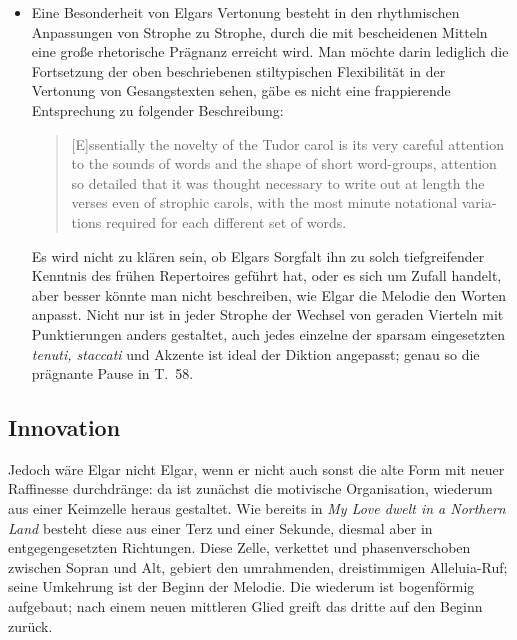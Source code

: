 \documentclass[a4paper,11pt,open=any]{scrbook}
\newcommand{\engquote}[1]{\foreignblockquote{english}{#1}}
\begin{document}
\begin{itemize}
 \item Eine Besonderheit von Elgars Vertonung besteht in den rhythmischen
 Anpassungen von Strophe zu Strophe, durch die mit bescheidenen Mitteln
 eine große rhetorische Prägnanz erreicht wird.  Man möchte darin lediglich die
 Fortsetzung der oben beschriebenen stiltypischen Flexibilität in der
 Vertonung von Gesangstexten sehen, gäbe es nicht eine frappierende
 Entsprechung zu folgender Beschreibung: \engquote{[E]ssentially the
 novelty of the Tudor carol is its very careful attention to the sounds
 of words and the shape of short word-groups, attention so detailed that
 it was thought necessary to write out at length the verses even of
 strophic carols, with the most minute notational variations required
 for each different set of words.\cite[S.~170]{carol}}  Es wird nicht
 zu klären sein, ob Elgars Sorgfalt ihn zu solch tiefgreifender Kenntnis
 des frühen Repertoires geführt hat, oder es sich um Zufall handelt, aber
 besser könnte man nicht beschreiben, wie Elgar die Melodie den Worten
 anpasst.  Nicht nur ist in jeder Strophe der Wechsel von geraden Vierteln
 mit Punktierungen anders gestaltet, auch jedes einzelne der sparsam
 eingesetzten \textit{tenuti, staccati} und Akzente ist ideal der Diktion
 angepasst; genau so die prägnante Pause in T.~58.
\end{itemize}

\subsection*{Innovation}
Jedoch wäre Elgar nicht Elgar, wenn er nicht auch sonst die alte Form
mit neuer Raffinesse durchdränge: da ist zunächst die motivische
Organisation, wiederum aus einer Keimzelle heraus gestaltet.  Wie bereits
in \textit{My Love dwelt in a Northern Land} besteht diese aus einer Terz
und einer Sekunde, diesmal aber in entgegengesetzten Richtungen.  Diese
Zelle, verkettet und phasenverschoben zwischen Sopran und Alt, gebiert
den umrahmenden, dreistimmigen Alleluia-Ruf; seine Umkehrung ist der
Beginn der Melodie.  Die wiederum ist bogenförmig aufgebaut; nach einem
neuen mittleren Glied greift das dritte auf den Beginn zurück.
\end{document}
